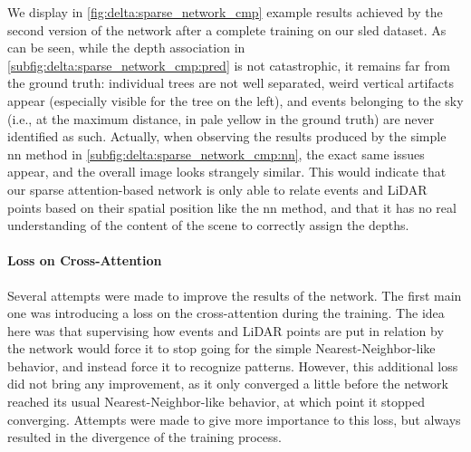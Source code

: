 We display in \cref{fig:delta:sparse_network_cmp} example results achieved by the second version of the network after a complete training on our \acrshort{sled} dataset. As can be seen, while the depth association in \cref{subfig:delta:sparse_network_cmp:pred} is not catastrophic, it remains far from the ground truth: individual trees are not well separated, weird vertical artifacts appear (especially visible for the tree on the left), and events belonging to the sky (i.e., at the maximum distance, in pale yellow in the ground truth) are never identified as such. Actually, when observing the results produced by the simple \acrfull{nn} method in \cref{subfig:delta:sparse_network_cmp:nn}, the exact same issues appear, and the overall image looks strangely similar. This would indicate that our sparse attention-based network is only able to relate events and LiDAR points based on their spatial position like the \acrshort{nn} method, and that it has no real understanding of the content of the scene to correctly assign the depths.

\paragraph{Loss on Cross-Attention}\label{sec:delta:sparse_network:issues:loss_att}
Several attempts were made to improve the results of the network. The first main one was introducing a loss on the cross-attention during the training. The idea here was that supervising how events and LiDAR points are put in relation by the network would force it to stop going for the simple Nearest-Neighbor-like behavior, and instead force it to recognize patterns. However, this additional loss did not bring any improvement, as it only converged a little before the network reached its usual Nearest-Neighbor-like behavior, at which point it stopped converging. Attempts were made to give more importance to this loss, but always resulted in the divergence of the training process.

